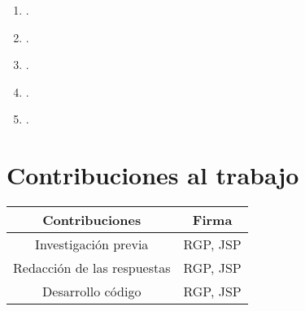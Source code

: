 \documentclass[12pt]{article}
\providecommand{\tightlist}{%
  \setlength{\itemsep}{0pt}\setlength{\parskip}{0pt}}
\begin{document}
\begin{enumerate}
\def\labelenumi{\arabic{enumi}.}
\tightlist
\item
.\\
\item
.\\
\item
.\\
\item
.\\
\item
.\\

\end{enumerate}

\hypertarget{contribuciones}{%
\section{Contribuciones al trabajo}\label{contribuciones}}
\begin{tabular}{| c | c |}
\hline
Contribuciones & Firma \\ \hline
Investigación previa & RGP, JSP \\
Redacción de las respuestas & RGP, JSP \\
Desarrollo código & RGP, JSP \\ \hline
\end{tabular}
\end{document}

